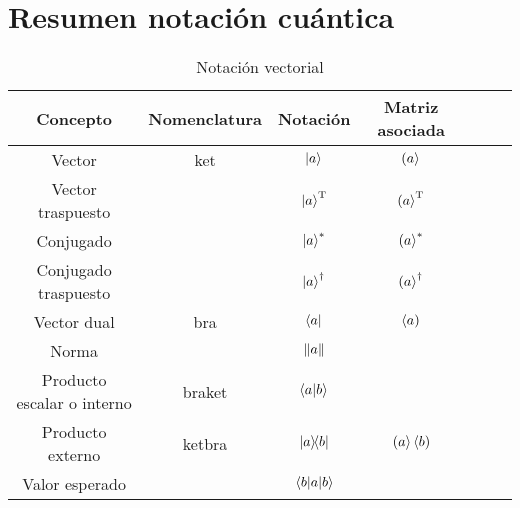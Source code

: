 \section{Resumen notación cuántica}\label{sec:resumen-notacion-cuantica}
\begin{table}[htbp]
	\caption{Notación vectorial\label{tab:notacion-vectorial}}
	\centering
	\begin{tabular}{ccccccc}
		\toprule
		Concepto                 & Nomenclatura & Notación              & Matriz asociada        \\
		\midrule
		Vector                     & ket          & $\ket{a}$             & $\left(a\right>$             \\
		Vector traspuesto          &              & $\ket{a}^\text{T}$ & $\left(a\right>^\text{T}$ \\
		Conjugado                  &              & $\ket{a}^*$           & $\left(a\right>^*$           \\
		Conjugado traspuesto       &              & $\ket{a}^\dag$        & $\left(a\right>^\dag$        \\
		Vector dual                & bra          & $\bra{a}$             & $\left<a\right)$             \\
		Norma                      &              & $\norm{a}$            &                        \\
		Producto escalar o interno & braket       & $\braket{a}{b}$       &                        \\
		Producto externo           & ketbra       & $\ketbra{a}{b}$       & $\left(a\right>\left<b\right)$       \\
		Valor esperado             &              & $\ev{a}{b}$           &                        \\
		\bottomrule
	\end{tabular}
\end{table}